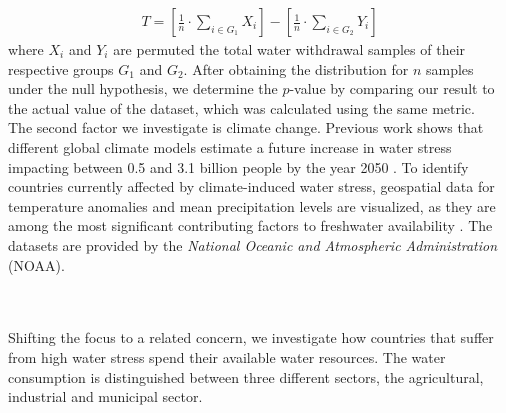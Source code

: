 \documentclass{article}
\theoremstyle{plain}
\theoremstyle{definition}
\theoremstyle{remark}
\begin{document}
\begin{align}
    T = \left[\frac{1}{n}\cdot\sum_{i \in G_1} X_i\right] - \left[\frac{1}{n}\cdot\sum_{i \in G_2} Y_i\right]
\end{align}
where $X_i$ and $Y_i$ are permuted the total water withdrawal samples of their respective groups $G_1$ and $G_2$. After obtaining the distribution for $n$ samples under the null hypothesis, we determine the $p$-value by comparing our result to the actual value of the dataset, which was calculated using the same metric.\\
The second factor we investigate is climate change. Previous work shows that different global climate models estimate a future increase in water stress impacting between 0.5 and 3.1 billion people by the year 2050 \cite{Gosling2016, Stringer2021}. To identify countries currently affected by climate-induced water stress, geospatial data for temperature anomalies \cite{Temp_NOAA2022} and mean precipitation levels \cite{Precip_NOAA2022} are visualized, as they are among the most significant contributing factors to freshwater availability \cite{Berghuijs2017}. The datasets are provided by the \textit{National Oceanic and Atmospheric Administration} (NOAA). 

\\\\
Shifting the focus to a related concern, we investigate how countries that suffer from high water stress spend their available water resources. The water consumption is distinguished between three different sectors, the agricultural, industrial and municipal sector.
\end{document}
